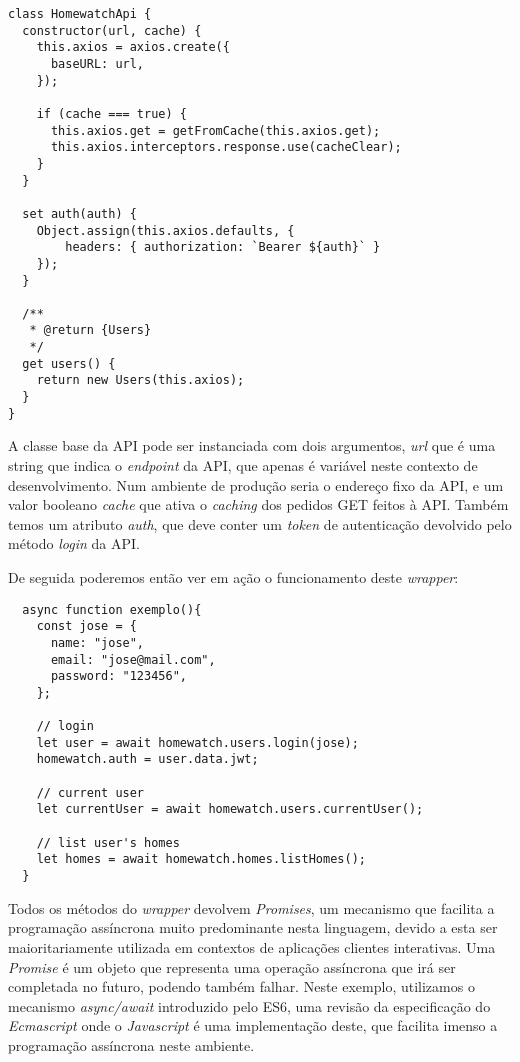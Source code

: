 \begin{verbatim}
class HomewatchApi {
  constructor(url, cache) {
    this.axios = axios.create({
      baseURL: url,
    });

    if (cache === true) {
      this.axios.get = getFromCache(this.axios.get);
      this.axios.interceptors.response.use(cacheClear);
    }
  }

  set auth(auth) {
    Object.assign(this.axios.defaults, { 
        headers: { authorization: `Bearer ${auth}` } 
    });
  }
  
  /**
   * @return {Users}
   */
  get users() {
    return new Users(this.axios);
  }
}
\end{verbatim}

A classe base da API pode ser instanciada com dois argumentos, \textit{url} que é uma string que indica o \textit{endpoint} da API, que apenas é variável neste contexto de desenvolvimento. Num ambiente de produção seria o endereço fixo da API, e um valor booleano \textit{cache} que ativa o \textit{caching} dos pedidos GET feitos à API. Também temos um atributo \textit{auth}, que deve conter um \textit{token} de autenticação devolvido pelo método \textit{login} da API.

De seguida poderemos então ver em ação o funcionamento deste \textit{wrapper}:

\begin{verbatim}
  async function exemplo(){
    const jose = {
      name: "jose",
      email: "jose@mail.com",
      password: "123456",
    };
    
    // login
    let user = await homewatch.users.login(jose);
    homewatch.auth = user.data.jwt;

    // current user
    let currentUser = await homewatch.users.currentUser();

    // list user's homes
    let homes = await homewatch.homes.listHomes();
  }
\end{verbatim}

Todos os métodos do \textit{wrapper} devolvem \textit{Promises}, um mecanismo que facilita a programação assíncrona muito predominante nesta linguagem, devido a esta ser maioritariamente utilizada em contextos de aplicações clientes interativas. Uma \textit{Promise} é um objeto que representa uma operação assíncrona que irá ser completada no futuro, podendo também falhar. Neste exemplo, utilizamos o mecanismo \textit{async/await} introduzido pelo ES6, uma revisão da especificação do \textit{Ecmascript} onde o \textit{Javascript} é uma implementação deste, que facilita imenso a programação assíncrona neste ambiente.

